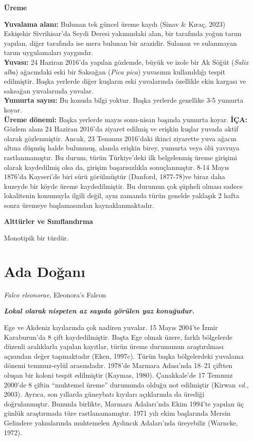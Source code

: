 \documentclass[
  10.5pt,
  a4paper,
  DIV=11,
  numbers=noendperiod,
  twocolumn]{scrreprt}
\begin{document}
\textbf{Üreme}

\textbf{Yuvalama alanı:} Bulunan tek güncel üreme kaydı (Sinav \& Kıraç,
2023) Eskişehir Sivrihisar'da Seydi Deresi yakınındaki alan, bir
tarafında yoğun tarım yapılan, diğer tarafında ise mera bulunan bir
arazidir. Sulanan ve sulanmayan tarım uygulamaları yaygındır.\\
\textbf{Yuvası:} 24 Haziran 2016'da yapılan gözlemde, büyük ve izole bir
Ak Söğüt (\emph{Salix alba}) ağacındaki eski bir Saksağan (\emph{Pica
pica}) yuvasının kullanıldığı tespit edilmiştir. Başka yerlerde diğer
kuşların eski yuvalarında özellikle ekin kargası ve saksağan yuvalarında
yuvalar.\\
\textbf{Yumurta sayısı:} Bu konuda bilgi yoktur. Başka yerlerde
genellike 3-5 yumurta koyar.\\
\textbf{Üreme dönemi:} Başka yerlerde mayıs sonu-nisan başında yumurta
koyar. \textbf{İÇA:} Gözlem alanı 24 Haziran 2016'da ziyaret edilmiş ve
erişkin kuşlar yuvada aktif olarak gözlenmiştir. Ancak, 23 Temmuz
2016'daki ikinci ziyarette yuva ağacın altına düşmüş halde bulunmuş,
alanda erişkin birey, yumurta veya ölü yavruya rastlanmamıştır. Bu
durum, türün Türkiye'deki ilk belgelenmiş üreme girişimi olarak
kaydedilmiş olsa da, girişim başarısızlıkla sonuçlanmıştır. 8-14 Mayıs
1876'da Kayseri'de biri sürü görülmüştür (Danford, 1877-78)ve biraz daha
kuzeyde bir köyde üreme kaydedilmiştir. Bu durumun çok şüpheli olması
sadece lokalitenin konumuyla ilgili değil, aynı zamanda türün genelde
yaklaşık 2 hafta sonra üremeye başlamasından kaynaklanmaktadır.

\textbf{Alttürler ve Sınıflandırma}

Monotipik bir türdür.

\section{Ada Doğanı}\label{ada-doux11fanux131}

\emph{Falco eleonorae}, Eleonora's Falcon

\textbf{\emph{Lokal olarak nispeten az sayıda görülen yaz konuğudur.}}

Ege ve Akdeniz kıyılarında çok nadiren yuvalar. 15 Mayıs 2004'te İzmir
Karaburun'da 8 çift kaydedilmiştir. Başta Ege olmak üzere, farklı
bölgelerde düzenli aralıklarla yapılan kayıtlar, türün üreme durumunun
araştırılması açısından değer taşımaktadır (Eken, 1997c). Türün başka
bölgelerdeki yuvalama dönemi temmuz-eylül arasındadır. 1978'de Marmara
Adası'nda 18--21 çiftten oluşan bir koloni tespit edilmiştir (Kaymas,
1980). Çanakkale'de 17 Temmuz 2000'de 8 çiftin ``muhtemel üreme''
durumunda olduğu not edilmiştir (Kirwan \emph{vd.}, 2003). Ayrıca, son
yıllarda güneybatı kıyıları açıklarında da ürediği doğrulanmıştır.
Bununla birlikte, Marmara Adaları'nda Ekim 1994'te yapılan üç günlük
araştırmada türe rastlanamamıştır. 1971 yılı ekim başlarında Mersin
Gelindere yakınlarında muhtemelen Aydıncık Adaları'nda üreyebilir
(Warncke, 1972).
\end{document}

